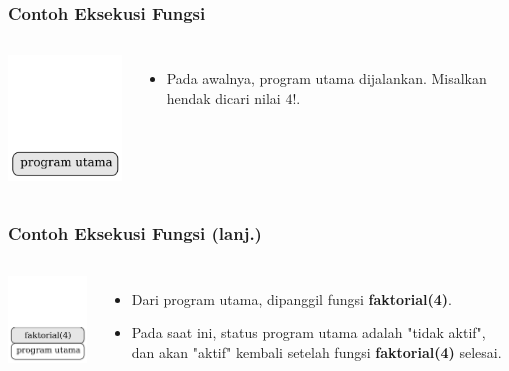\begin{frame}
\frametitle{Contoh Eksekusi Fungsi}
\begin{columns}
    \centering
    \includegraphics[width=4cm]{asset/rekursi-1.pdf}
    \begin{itemize}
      \item Pada awalnya, program utama dijalankan. Misalkan hendak dicari nilai $4!$.
    \end{itemize} 
  \end{columns} 
\end{frame}

\begin{frame}
\frametitle{Contoh Eksekusi Fungsi (lanj.)}
\begin{columns}
    \centering
    \includegraphics[width=4cm]{asset/rekursi-2.pdf}
    \begin{itemize}
      \item Dari program utama, dipanggil fungsi \textbf{faktorial(4)}.
      \item Pada saat ini, status program utama adalah "tidak aktif", dan akan "aktif" kembali setelah fungsi \textbf{faktorial(4)} selesai.
    \end{itemize}
  \end{columns} 
\end{frame}

